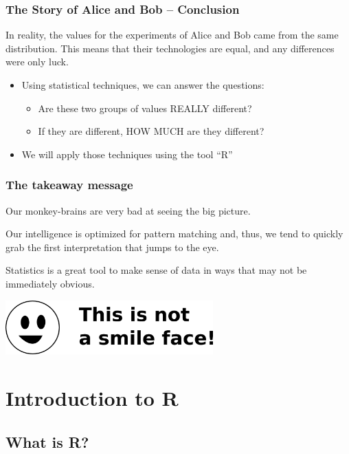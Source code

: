 \documentclass[10pt]{beamer}
\begin{document}
\begin{frame}
  \frametitle{The Story of Alice and Bob -- Conclusion}
  \begin{block}{}
    In reality, the values for the experiments of Alice and Bob came
    from the same distribution. This means that their technologies are
    equal, and any differences were only luck.
  \end{block}
  \bigskip
  
  \begin{itemize}
  \item Using statistical techniques, we can answer the questions:
    \begin{itemize}
    \item Are these two groups of values REALLY different?
    \item If they are different, HOW MUCH are they different?
    \end{itemize}
  \item We will apply those techniques using the tool ``R''
  \end{itemize}
\end{frame}

\begin{frame}
  \frametitle{The takeaway message} 

  Our monkey-brains are \alert{very bad} at seeing the big
  picture. 
  
  \bigskip
  
  Our intelligence is optimized for pattern matching and, thus, we
  tend to quickly grab the first interpretation that jumps to the eye.

  \bigskip
  
  Statistics is a great tool to make sense of data in ways that may
  not be immediately obvious.

  \bigskip
  
  \includegraphics[width=0.6\textwidth]{img/smile}

\end{frame}

\section{Introduction to R}
\subsection{What is R?}
\end{document}
